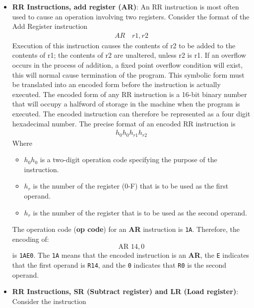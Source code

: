 \documentclass{report}
\begin{document}
\begin{itemize}
\begin{itemize}
                \item \textbf{RR Instructions, add register (AR)}: An RR instruction is most often used to cause an operation involving two registers.
                    \bigbreak \noindent 
                    Consider the format of the Add Register instruction
                    \begin{align*}
                        AR \quad r1,r2
                    \end{align*}
                    Execution of this instruction causes the contents of r2 to be added to the contents of r1; the contents of r2 are unaltered, unless r2 is r1. If an overflow occurs in the process of addition, a fixed point overflow condition will exist, this will normal cause termination of the program.
                    \bigbreak \noindent 
                    This symbolic form must be translated into an encoded form before the instruction is actually executed. The encoded form of any RR instruction is a 16-bit binary number that will occupy a halfword of storage in the machine when the program is executed. The encoded instruction can therefore be represented as a four digit hexadecimal number. The precise format of an encoded RR instruction is
                    \begin{align*}
                        h_{0}h_{0}h_{r1}h_{r2}
                    \end{align*}
                    Where
                    \begin{itemize}
                        \item $h_0h_0$ is a two-digit operation code specifying the purpose of the instruction.
                        \item $h_r$ is the number of the register (0-F) that is to be used as the first operand.
                        \item $h_r$ is the number of the register that is to be used as the second operand.
                    \end{itemize}
                    \bigbreak \noindent 
                    The operation code (\textbf{op code}) for an \textbf{AR} instruction is \texttt{1A}. Therefore, the encoding of:
                    \[
                        \text{AR } 14,0
                    \]
                    is \texttt{1AE0}. The \texttt{1A} means that the encoded instruction is an \textbf{AR}, the \texttt{E} indicates that the first operand is \texttt{R14}, and the \texttt{0} indicates that \texttt{R0} is the second operand.
                \item \textbf{RR Instructions, SR (Subtract register) and LR (Load register)}: Consider the instruction

\end{itemize}
\end{itemize}
\end{document}
